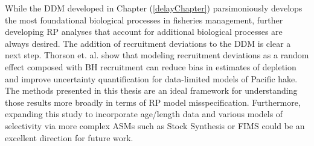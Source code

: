 \documentclass[12pt]{ucscthesis}
\begin{document}
%
While the DDM developed in Chapter (\ref{delayChapter}) parsimoniously develops 
the most foundational biological processes in fisheries management, further 
developing RP analyses that account for additional biological processes are 
always desired. The addition of recruitment deviations to the DDM is clear a next 
step. Thorson et. al. \cite{thorson_case_2019} show that modeling recruitment deviations
as a random effect composed with BH recruitment can reduce bias in estimates of depletion 
and improve uncertainty quantification for data-limited models of Pacific hake. %
The methods presented in this thesis are an ideal framework for understanding those 
results more broadly in terms of RP model misspecification. Furthermore, 
expanding this study to incorporate age/length data and various models of selectivity 
via more complex ASMs such as Stock Synthesis \cite{methot_stock_2013} or FIMS \cite{stawitz_fisheries_2023}
could be an excellent direction for future work.



\end{document}
